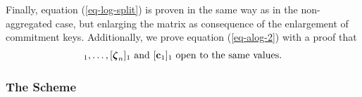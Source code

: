 Finally, equation (\ref{eq-log-split}) is proven in the same way as in the non-aggregated case, but enlarging the matrix as consequence of the enlargement of commitment keys. Additionally, we prove equation (\ref{eq-alog-2}) with a proof that
\begin{align*}
[\grkb{\zeta}_1]_1,\ldots,[\grkb{\zeta}_n]_1 \text{ and } [\vecb{c}_1]_1 \text{ open to the same values.}
\end{align*}
\iffalse
We prove soundness in the same fashion as the protocols from Chapter \ref{sec:shuf-rp}, that is we guess the index $j^*$ of an element $x_{j^*}\notin S$ in order to choose $\vecb{h}_{j^*}$ linearly independent from the other vectors in $ck$. Similarly as in the non-aggregated case, we will guess the (sub-)path $(b_{j^*,m+1},\ldots, b_{j^*,1})$ (where $b_{j^*,1},\ldots,b_{j^*,m}$ are the uniques openings of, respectively, $[\vecb{d}_1]_2,\ldots,[\vecb{d}]_m$ at position $j^*$) and we will choose, for each $\ell\in[m]$, $\vecb{g}_{\ell,\alpha_{j^*,\ell}}$ linearly independent from the other vectors in $ck_\ell$, where $\alpha_{j^*,\ell}:=(\alpha_{j^*}-1 \mod 2^{\ell-1})+1$. With such choice of the commitment keys, we will be able to prove that $x_{j^*}=s_{\alpha_{j^*}}$ unless we can break some hardness assumption.
Consequently, the total security loss in the reduction will be of a factor of $\frac{2}{nt}$.  
\fi
\subsubsection{The Scheme}

